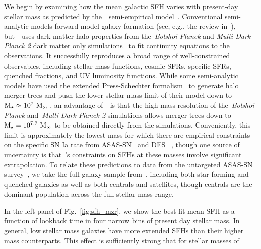 \documentclass[foo.tex]{subfiles}
\begin{document}
We begin by examining how the mean galactic SFH varies with present-day stellar
mass as predicted by the~\um~semi-empirical model~\citep{Behroozi2019}.
{\color{red}
Conventional semi-analytic models forward model galaxy
formation (see, e.g., the review in~\citealt{Somerville2015a}), but~\um~uses
dark matter halo properties from the~\textit{Bolshoi-Planck} and
\textit{Multi-Dark Planck 2} dark matter only simulations~\citep{Klypin2016}
to fit continuity equations to the observations.
It successfully reproduces a broad range of well-constrained observables,
including stellar mass functions, cosmic SFRs, specific SFRs, quenched
fractions, and UV luminosity functions.
}
While some semi-analytic models have used the extended Press-Schechter
formalism~\citep{Press1974, Bond1991} to generate halo merger trees and push
the lower stellar mass limit of their model down to~$\text{M}_\star \approx 10^7~\text{M}_\odot$
\citep[e.g.][]{Somerville2015b}, an advantage of~\um~is that the high mass
resolution of the~\textit{Bolshoi-Planck} and~\textit{Multi-Dark Planck 2}
simulations allows merger trees down to~$\text{M}_\star = 10^{7.2}~\text{M}_\odot$ to be
obtained directly from the simulations.
Conveniently, this limit is approximately the lowest mass for which there are
empirical constraints on the specific SN Ia rate from ASAS-SN~\citep{Brown2019}
and DES~\citep{Wiseman2021}%
{\color{red}%
, though one source of uncertainty is that~\um's constraints on SFHs at these
masses involve significant extrapolation.}
To relate these predictions to data from the untargeted ASAS-SN
survey~\citep{Shappee2014, Kochanek2017}, we take the full galaxy
sample from~\um, including both star forming and quenched galaxies as
well as both centrals and satellites, though centrals are the dominant
population across the full stellar mass range.
\par
In the left panel of Fig.~\ref{fig:sfh_mzr}, we show the best-fit mean SFH as a
function of lookback time in four narrow bins of present day stellar mass.
In general, low stellar mass galaxies have more extended SFHs than their
higher mass counterparts.
This effect is sufficiently strong that for stellar masses of
\end{document}
